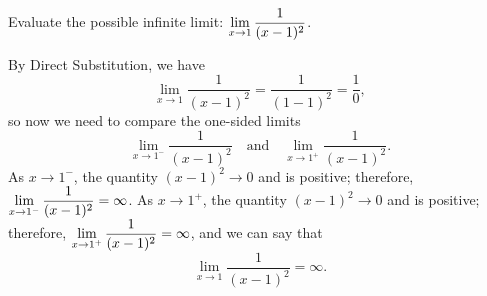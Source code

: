 \begin{example} \label{Ex:1.2.Eg1}
Evaluate the possible infinite limit:  $\displaystyle \lim_{x \to 1} \frac{1}{(x-1)^2}$.

\solution By Direct Substitution, we have
\[ \lim_{x \to 1} \frac{1}{(x-1)^2} = \frac{1}{(1-1)^2} = \frac{1}{0}, \]
so now we need to compare the one-sided limits
\[  \lim_{x \to 1^-} \frac{1}{(x-1)^2} \quad \mbox{and} \quad \lim_{x \to 1^+} \frac{1}{(x-1)^2}. \]
As $x \to 1^-$, the quantity $(x-1)^2 \to 0$ and is positive; therefore, $\displaystyle \lim_{x \to 1^-} \frac{1}{(x-1)^2} = \infty$.  As $x \to 1^+$, the quantity $(x-1)^2 \to 0$ and is positive; therefore, $\displaystyle \lim_{x \to 1^+} \frac{1}{(x-1)^2} = \infty$, and we can say that
\[ \lim_{x \to 1} \frac{1}{(x-1)^2} = \infty. \]
\end{example}